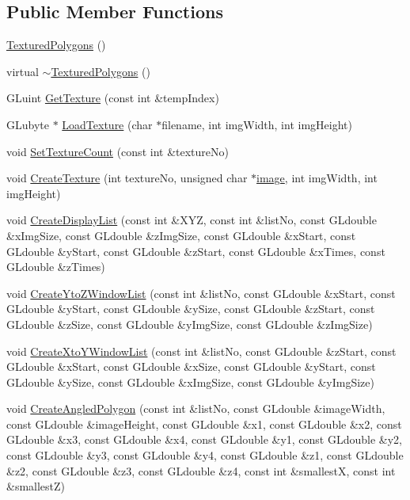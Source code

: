 \subsection*{Public Member Functions}
\begin{DoxyCompactItemize}
\item 
\hyperlink{class_textured_polygons_a2fd288c8e0d4a158c1c36c7474e0a4c2}{Textured\+Polygons} ()
\item 
virtual \hyperlink{class_textured_polygons_a276d8e169ea115c0229b01734c6cee7f}{$\sim$\+Textured\+Polygons} ()
\item 
G\+Luint \hyperlink{class_textured_polygons_af6694e3cbea65de23f5dcfab77a48b99}{Get\+Texture} (const int \&temp\+Index)
\item 
G\+Lubyte $\ast$ \hyperlink{class_textured_polygons_af491c14a7711097065a61e8b54c95647}{Load\+Texture} (char $\ast$filename, int img\+Width, int img\+Height)
\item 
void \hyperlink{class_textured_polygons_a172716856851bb2b34fc1a66fb0b0b92}{Set\+Texture\+Count} (const int \&texture\+No)
\item 
void \hyperlink{class_textured_polygons_ac197b25a7152feed1499351f22446a45}{Create\+Texture} (int texture\+No, unsigned char $\ast$\hyperlink{main_8cpp_af673cb5418d7f684e255beb5c190260e}{image}, int img\+Width, int img\+Height)
\item 
void \hyperlink{class_textured_polygons_a4b21cfdd9a38b6026bc1f0e8bd2455a1}{Create\+Display\+List} (const int \&X\+YZ, const int \&list\+No, const G\+Ldouble \&x\+Img\+Size, const G\+Ldouble \&z\+Img\+Size, const G\+Ldouble \&x\+Start, const G\+Ldouble \&y\+Start, const G\+Ldouble \&z\+Start, const G\+Ldouble \&x\+Times, const G\+Ldouble \&z\+Times)
\item 
void \hyperlink{class_textured_polygons_af3a7080054a94bd1d237c1e8afe7c394}{Create\+Yto\+Z\+Window\+List} (const int \&list\+No, const G\+Ldouble \&x\+Start, const G\+Ldouble \&y\+Start, const G\+Ldouble \&y\+Size, const G\+Ldouble \&z\+Start, const G\+Ldouble \&z\+Size, const G\+Ldouble \&y\+Img\+Size, const G\+Ldouble \&z\+Img\+Size)
\item 
void \hyperlink{class_textured_polygons_af5b832e3512d14a5f69f98707fe9c14e}{Create\+Xto\+Y\+Window\+List} (const int \&list\+No, const G\+Ldouble \&z\+Start, const G\+Ldouble \&x\+Start, const G\+Ldouble \&x\+Size, const G\+Ldouble \&y\+Start, const G\+Ldouble \&y\+Size, const G\+Ldouble \&x\+Img\+Size, const G\+Ldouble \&y\+Img\+Size)
\item 
void \hyperlink{class_textured_polygons_a60c92fd32d48dc25bb93badc44ed2d01}{Create\+Angled\+Polygon} (const int \&list\+No, const G\+Ldouble \&image\+Width, const G\+Ldouble \&image\+Height, const G\+Ldouble \&x1, const G\+Ldouble \&x2, const G\+Ldouble \&x3, const G\+Ldouble \&x4, const G\+Ldouble \&y1, const G\+Ldouble \&y2, const G\+Ldouble \&y3, const G\+Ldouble \&y4, const G\+Ldouble \&z1, const G\+Ldouble \&z2, const G\+Ldouble \&z3, const G\+Ldouble \&z4, const int \&smallestX, const int \&smallestZ)
\end{DoxyCompactItemize}
